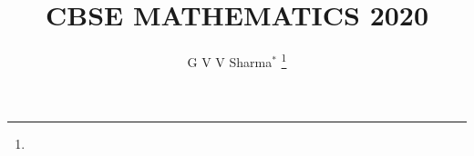 \documentclass[journal,12pt,twocolumn]{IEEEtran}
\DeclareMathOperator*{\Res}{Res}
\begin{document}
\newtheorem{theorem}{Theorem}[section]
\newtheorem{problem}{Problem}
\newtheorem{proposition}{Proposition}[section]
\newtheorem{lemma}{Lemma}[section]
\newtheorem{corollary}[theorem]{Corollary}
\newtheorem{example}{Example}[section]
\newtheorem{definition}[problem]{Definition}
\newcommand{\BEQA}{\begin{eqnarray}}
\newcommand{\EEQA}{\end{eqnarray}}
\newcommand{\define}{\stackrel{\triangle}{=}}
\newcommand*\circled[1]{\tikz[baseline=(char.base)]{
    \node[shape=circle,draw,inner sep=2pt] (char) {#1};}}

\providecommand{\mbf}{\mathbf}
\providecommand{\pr}[1]{\ensuremath{\Pr\left(#1\right)}}
\providecommand{\qfunc}[1]{\ensuremath{Q\left(#1\right)}}
\providecommand{\sbrak}[1]{\ensuremath{{}\left[#1\right]}}
\providecommand{\lsbrak}[1]{\ensuremath{{}\left[#1\right.}}
\providecommand{\rsbrak}[1]{\ensuremath{{}\left.#1\right]}}
\providecommand{\brak}[1]{\ensuremath{\left(#1\right)}}
\providecommand{\lbrak}[1]{\ensuremath{\left(#1\right.}}
\providecommand{\rbrak}[1]{\ensuremath{\left.#1\right)}}
\providecommand{\cbrak}[1]{\ensuremath{\left\{#1\right\}}}
\providecommand{\lcbrak}[1]{\ensuremath{\left\{#1\right.}}
\providecommand{\rcbrak}[1]{\ensuremath{\left.#1\right\}}}
\theoremstyle{remark}
\newtheorem{rem}{Remark}
\newcommand{\sgn}{\mathop{\mathrm{sgn}}}
\providecommand{\abs}[1]{\left\vert#1\right\vert}
\providecommand{\res}[1]{\Res\displaylimits_{#1}} 
\providecommand{\norm}[1]{\left\lVert#1\right\rVert}
\providecommand{\mtx}[1]{\mathbf{#1}}
\providecommand{\mean}[1]{E\left[ #1 \right]}
\providecommand{\fourier}{\overset{\mathcal{F}}{ \rightleftharpoons}}
\providecommand{\system}{\overset{\mathcal{H}}{ \longleftrightarrow}}
\newcommand{\solution}{\noindent \textbf{Solution: }}
\newcommand{\cosec}{\,\text{cosec}\,}
\providecommand{\dec}[2]{\ensuremath{\overset{#1}{\underset{#2}{\gtrless}}}}
\newcommand{\myvec}[1]{\ensuremath{\begin{pmatrix}#1\end{pmatrix}}}
\newcommand{\mydet}[1]{\ensuremath{\begin{vmatrix}#1\end{vmatrix}}}
\newcommand*{\permcomb}[4][0mu]{{{}^{#3}\mkern#1#2_{#4}}}
\newcommand*{\perm}[1][-3mu]{\permcomb[#1]{P}}
\newcommand*{\comb}[1][-1mu]{\permcomb[#1]{C}}
\makeatletter
{}
\makeatother
\let\StandardTheFigure\thefigure
\let\vec\mathbf
\renewcommand{\thefigure}{\theproblem}
\def\putbox#1#2#3{\makebox[0in][l]{\makebox[#1][l]{}\raisebox{\baselineskip}[0in][0in]{\raisebox{#2}[0in][0in]{#3}}}}
     \def\rightbox#1{\makebox[0in][r]{#1}}
     \def\centbox#1{\makebox[0in]{#1}}
     \def\topbox#1{\raisebox{-\baselineskip}[0in][0in]{#1}}
     \def\midbox#1{\raisebox{-0.5\baselineskip}[0in][0in]{#1}}
\vspace{3cm}
\title{CBSE MATHEMATICS 2020}
\author{G V V Sharma$^{*}$
	\thanks{}
}
\maketitle
\end{document}
